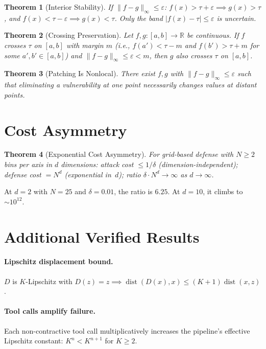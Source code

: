 \documentclass[11pt]{article}
\newtheorem{theorem}{Theorem}[section]
\newcommand{\R}{\mathbb{R}}
\newcommand{\dist}{\operatorname{dist}}
\begin{document}
\begin{theorem}[Interior Stability]
\label{thm:interior-stable}
If $\|f - g\|_\infty \leq \varepsilon$:
$f(x) > \tau + \varepsilon \implies g(x) > \tau$, and
$f(x) < \tau - \varepsilon \implies g(x) < \tau$.
Only the band $|f(x) - \tau| \leq \varepsilon$ is uncertain.
\end{theorem}

\begin{theorem}[Crossing Preservation]
\label{thm:crossing}
Let $f, g\colon [a,b] \to \R$ be continuous. If $f$ crosses $\tau$
on $[a,b]$ with margin $m$ (i.e., $f(a') < \tau - m$ and
$f(b') > \tau + m$ for some $a', b' \in [a,b]$) and
$\|f - g\|_\infty \leq \varepsilon < m$, then $g$ also crosses
$\tau$ on $[a,b]$.
\end{theorem}

\begin{theorem}[Patching Is Nonlocal]
\label{thm:nonlocal}
There exist $f, g$ with $\|f-g\|_\infty \leq \varepsilon$ such that
eliminating a vulnerability at one point necessarily changes values at
distant points.
\end{theorem}


\section{Cost Asymmetry}
\label{app:cost}

\begin{theorem}[Exponential Cost Asymmetry]
\label{thm:cost}
For grid-based defense with $N \geq 2$ bins per axis in $d$ dimensions:
attack cost $\leq 1/\delta$ (dimension-independent); defense cost
$= N^d$ (exponential in~$d$); ratio
$\delta \cdot N^d \to \infty$ as $d\to\infty$.
\end{theorem}

At $d=2$ with $N=25$ and $\delta=0.01$, the ratio is $6.25$.
At $d=10$, it climbs to $\sim 10^{12}$.


\section{Additional Verified Results}
\label{app:additional}

\paragraph{Lipschitz displacement bound.}
$D$ is $K$-Lipschitz with $D(z) = z \implies
\dist(D(x), x) \leq (K+1)\dist(x,z)$.

\paragraph{Tool calls amplify failure.}
Each non-contractive tool call multiplicatively increases the pipeline's
effective Lipschitz constant: $K^n < K^{n+1}$ for $K \geq 2$.
\end{document}

